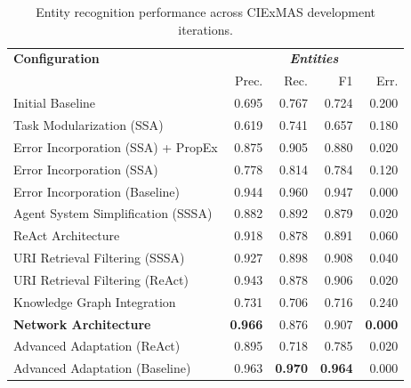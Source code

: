 \documentclass[a4paper,oneside,bibliography=totoc]{scrbook}
\begin{document}
\begin{table}[h]
  \centering
  \begin{tabular}{p{6cm}|rrrr}
    \toprule
    \textbf{Configuration}                       & \multicolumn{4}{c}{\textit{\textbf{Entities}}}                                                    \\
                                                 & Prec.                                          & Rec.           & F1             & Err.           \\
    \midrule
    Initial Baseline                             & 0.695                                          & 0.767          & 0.724          & 0.200          \\
    Task Modularization (\ac{SSA})               & 0.619                                          & 0.741          & 0.657          & 0.180          \\
    Error Incorporation (\ac{SSA}) + \ac{PropEx} & 0.875                                          & 0.905          & 0.880          & 0.020          \\
    Error Incorporation (\ac{SSA})               & 0.778                                          & 0.814          & 0.784          & 0.120          \\
    Error Incorporation (Baseline)               & 0.944                                          & 0.960          & 0.947          & 0.000          \\
    Agent System Simplification (\ac{SSSA})      & 0.882                                          & 0.892          & 0.879          & 0.020          \\
    \ac{ReAct} Architecture                      & 0.918                                          & 0.878          & 0.891          & 0.060          \\
    \ac{URI} Retrieval Filtering (\ac{SSSA})     & 0.927                                          & 0.898          & 0.908          & 0.040          \\
    \ac{URI} Retrieval Filtering (\ac{ReAct})    & 0.943                                          & 0.878          & 0.906          & 0.020          \\
    Knowledge Graph Integration                  & 0.731                                          & 0.706          & 0.716          & 0.240          \\
    \textbf{Network Architecture}                & \textbf{0.966}                                 & 0.876          & 0.907          & \textbf{0.000} \\
    Advanced Adaptation (\ac{ReAct})             & 0.895                                          & 0.718          & 0.785          & 0.020          \\
    Advanced Adaptation (Baseline)               & 0.963                                          & \textbf{0.970} & \textbf{0.964} & 0.000          \\
    \bottomrule
  \end{tabular}
  \caption{Entity recognition performance across CIExMAS development iterations.}
  \label{tab:evaluation_entities_iterations}
\end{table}
\end{document}

